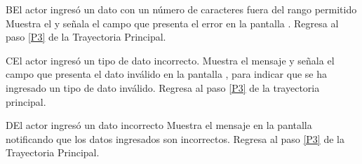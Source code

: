 		\begin{UCtrayectoriaA}{B}{El actor ingresó un dato con un número de caracteres fuera del rango permitido}
	\UCpaso[\UCsist] Muestra el  y señala el campo que presenta el error en la pantalla .
	\UCpaso[\UCactor] Regresa al paso \ref{P3} de la Trayectoria Principal.
\end{UCtrayectoriaA}

	\begin{UCtrayectoriaA}{C}{El actor ingresó un tipo de dato incorrecto.}
		\UCpaso[\UCsist] Muestra el mensaje  y señala el campo que presenta el dato inválido en la pantalla , para indicar que se ha ingresado un tipo de dato inválido.
		\UCpaso Regresa al paso \ref{P3} de la trayectoria principal.
	\end{UCtrayectoriaA}
		\begin{UCtrayectoriaA}{D}{El actor ingresó un dato incorrecto}
	\UCpaso[\UCsist] Muestra el mensaje  en la pantalla  notificando que los datos ingresados son incorrectos.
	\UCpaso[\UCactor] Regresa al paso \ref{P3} de la Trayectoria Principal.
\end{UCtrayectoriaA}